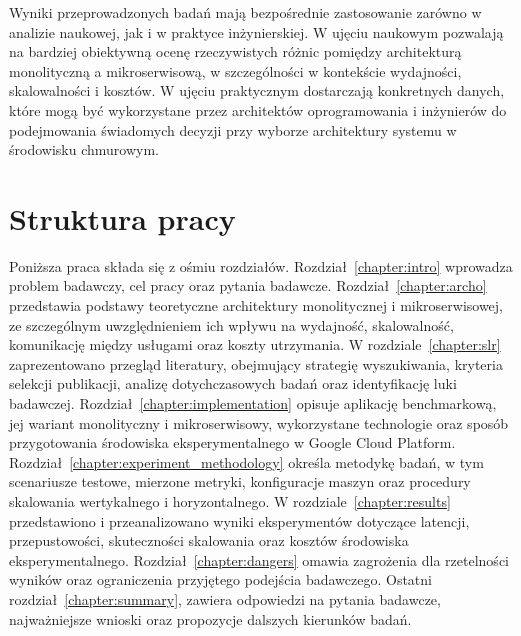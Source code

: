Wyniki przeprowadzonych badań mają bezpośrednie zastosowanie zarówno w analizie naukowej, jak i w praktyce inżynierskiej. W ujęciu naukowym pozwalają na bardziej obiektywną ocenę rzeczywistych różnic pomiędzy architekturą monolityczną a mikroserwisową, w szczególności w kontekście wydajności, skalowalności i kosztów. W ujęciu praktycznym dostarczają konkretnych danych, które mogą być wykorzystane przez architektów oprogramowania i inżynierów do podejmowania świadomych decyzji przy wyborze architektury systemu w środowisku chmurowym.
\section{Struktura pracy}

Poniższa praca składa się z ośmiu rozdziałów. Rozdział~\ref{chapter:intro} wprowadza problem badawczy, cel pracy oraz pytania badawcze. Rozdział~\ref{chapter:archo} przedstawia podstawy teoretyczne architektury monolitycznej i mikroserwisowej, ze szczególnym uwzględnieniem ich wpływu na wydajność, skalowalność, komunikację między usługami oraz koszty utrzymania. W rozdziale~\ref{chapter:slr} zaprezentowano przegląd literatury, obejmujący strategię wyszukiwania, kryteria selekcji publikacji, analizę dotychczasowych badań oraz identyfikację luki badawczej. Rozdział~\ref{chapter:implementation} opisuje aplikację benchmarkową, jej wariant monolityczny i mikroserwisowy, wykorzystane technologie oraz sposób przygotowania środowiska eksperymentalnego w Google Cloud Platform. Rozdział~\ref{chapter:experiment_methodology} określa metodykę badań, w tym scenariusze testowe, mierzone metryki, konfiguracje maszyn oraz procedury skalowania wertykalnego i horyzontalnego. W rozdziale~\ref{chapter:results} przedstawiono i przeanalizowano wyniki eksperymentów dotyczące latencji, przepustowości, skuteczności skalowania oraz kosztów środowiska eksperymentalnego. Rozdział~\ref{chapter:dangers} omawia zagrożenia dla rzetelności wyników oraz ograniczenia przyjętego podejścia badawczego. Ostatni rozdział~\ref{chapter:summary}, zawiera odpowiedzi na pytania badawcze, najważniejsze wnioski oraz propozycje dalszych kierunków badań.